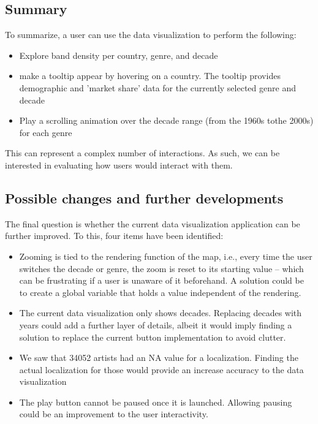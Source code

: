 \documentclass[twocolumn, letterpaper,13pt]{scrartcl}
\begin{document}
    \subsection{Summary}
    
    To summarize, a user can use the data visualization to perform the following:
    \begin{itemize}
        \item Explore band density per country, genre, and decade
        \item  make a tooltip appear by hovering on a country. The tooltip provides demographic and 'market share' data for the currently selected genre and decade
        \item Play a scrolling animation over the decade range (from the 1960s tothe 2000s) for each genre
    \end{itemize}
    
    This can represent a complex number of interactions.  As such, we can be interested in evaluating how users would interact with them.
    
    \subsection{Possible changes and further developments}
    
    The final question is whether the current data visualization application can be further improved. To this, four items have been identified:
    
    \begin{itemize}
        \item Zooming is tied to the rendering function of the map, i.e., every time the user switches the decade or genre, the zoom is reset to its starting value -- which can be frustrating if a user is unaware of it beforehand. A solution could be to create a global variable that holds a value independent of the rendering.
        \item The current data visualization only shows decades. Replacing decades with years could add a further layer of details, albeit it would imply finding a solution to replace the current button implementation to avoid clutter.
        \item We saw that 34052 artists had an NA value for a localization. Finding the actual localization for those would provide an increase accuracy to the data visualization
        \item The play button cannot be paused once it is launched. Allowing pausing could be an improvement to the user interactivity.
    \end{itemize}
    
\end{document}
